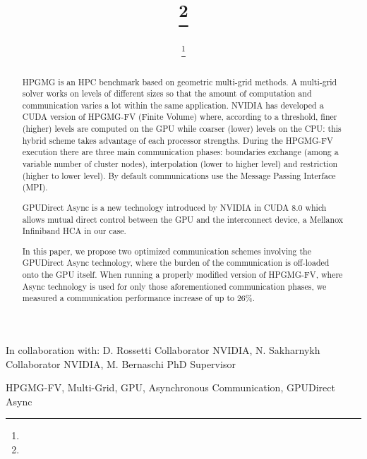 \documentclass[review]{siamart1116}
\author{\TheName\thanks{\TheAddress}}
\title{{\TheTitle}\thanks{\TheFunding}}
\newcommand{\TheCollaborators}{%
D. Rossetti Collaborator NVIDIA,  
N. Sakharnykh Collaborator NVIDIA,
M. Bernaschi PhD Supervisor
}
\begin{document}
\maketitle

\begin{center}
In collaboration with:
  {\TheCollaborators}
\end{center}
\vspace{1cm}

\begin{abstract}
HPGMG is an HPC benchmark based on geometric multi-grid methods.
%
A multi-grid solver works on levels of different sizes so that the amount of
computation and communication varies a lot within the same application.
%
NVIDIA has developed a CUDA version of HPGMG-FV (Finite Volume) where,
according to a threshold, finer (higher) levels are computed on the GPU
while coarser (lower) levels on the CPU: this hybrid scheme takes advantage
of each processor strengths.
% 
During the HPGMG-FV execution there are three main communication
phases: boundaries exchange (among a variable number of cluster nodes),
interpolation (lower to higher level) and restriction (higher to lower
level). By default communications use the Message Passing Interface (MPI).

GPUDirect Async is a new technology introduced by NVIDIA in CUDA 8.0 which
allows mutual direct control between the GPU and the interconnect device, a
Mellanox Infiniband HCA in our case.
 
In this paper, we propose two optimized communication schemes involving the
GPUDirect Async technology, where the burden of the communication is
off-loaded onto the GPU itself.
% 
When running a properly modified version of HPGMG-FV, where Async
technology is used for only those aforementioned communication phases, we
measured a communication performance increase of up to 26\%.

\end{abstract}

\begin{keywords}
  HPGMG-FV, Multi-Grid, GPU, Asynchronous Communication, GPUDirect Async
\end{keywords}
\end{document}
